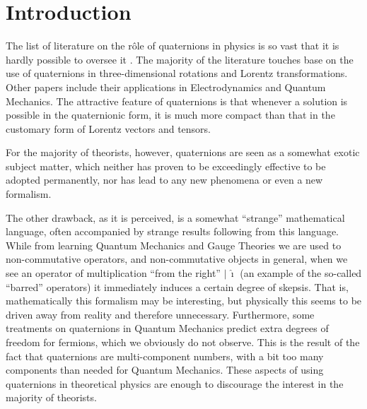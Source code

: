 \documentclass[epsfig,12pt]{article}
\newcommand{\ii}{\hat\imath}
\begin{document}
\section{Introduction}
\setcounter{equation}{0}

	The list of literature on the r\^ole of quaternions in physics is so vast that it is hardly
	possible to oversee it \cite{}.
	The majority of the literature touches base on the use of quaternions in three-dimensional
	rotations and Lorentz transformations.
	Other papers include their applications in Electrodynamics and Quantum Mechanics.
	The attractive feature of quaternions is that whenever a solution is possible in the quaternionic form,
	it is much more compact than that in the customary form of Lorentz vectors and tensors. 

	For the majority of theorists, however, quaternions are seen as a somewhat exotic subject matter,
	which neither has proven to be exceedingly effective to be adopted permanently, nor has lead
	to any new phenomena or even a new formalism.

	The other drawback, as it is perceived, is a somewhat ``strange'' mathematical language,
        often accompanied by strange results following from this language.
	While from learning Quantum Mechanics and Gauge Theories we are used to non-commutative operators,
	and non-commutative objects in general, when we see an operator of multiplication ``from the right'' $ |\, \ii $
        (an example of the so-called ``barred'' operators) it immediately induces a certain degree of skepsis.
	That is, mathematically this formalism may be interesting, but physically this seems to be
	driven away from reality and therefore unnecessary.
	Furthermore, some treatments on quaternions in Quantum Mechanics predict extra degrees of freedom for fermions,
	which we obviously do not observe.
	This is the result of the fact that quaternions are multi-component numbers,
        with a bit too many components than needed for Quantum Mechanics.
        These aspects of using quaternions in theoretical physics are enough to discourage the interest in the
        majority of theorists.
\end{document}
